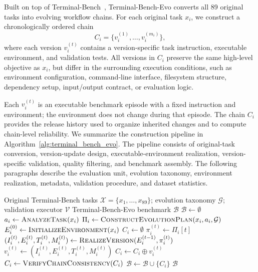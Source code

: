 \documentclass{article}
\begin{document}
Built on top of Terminal-Bench~\cite{terminal-bench}, Terminal-Bench-Evo converts all 89 original tasks into evolving workflow chains. For each original task $x_i$, we construct a chronologically ordered chain
\[
C_i = \{v_i^{(1)}, \ldots, v_i^{(m_i)}\},
\]
where each version $v_i^{(t)}$ contains a version-specific task instruction, executable environment, and validation tests. All versions in $C_i$ preserve the same high-level objective as $x_i$, but differ in the surrounding execution conditions, such as environment configuration, command-line interface, filesystem structure, dependency setup, input/output contract, or evaluation logic.

Each $v_i^{(t)}$ is an executable benchmark episode with a fixed instruction and environment; the environment does not change during that episode. The chain $C_i$ provides the release history used to organize inherited changes and to compute chain-level reliability. We summarize the construction pipeline in Algorithm~\ref{alg:terminal_bench_evo}. The pipeline consists of original-task conversion, version-update design, executable-environment realization, version-specific validation, quality filtering, and benchmark assembly. The following paragraphs describe the evaluation unit, evolution taxonomy, environment realization, metadata, validation procedure, and dataset statistics.

\begin{algorithm}[t]
\caption{Construction of Terminal-Bench-Evo}
\label{alg:terminal_bench_evo}
\begin{algorithmic}[1]
\Require Original Terminal-Bench tasks $\mathcal{X}=\{x_1,\ldots,x_{89}\}$; evolution taxonomy $\mathcal{G}$; validation executor $\mathcal{V}$
\Ensure Terminal-Bench-Evo benchmark $\mathcal{B}$
\State $\mathcal{B}\leftarrow \emptyset$
    \State $a_i \leftarrow \textsc{AnalyzeTask}(x_i)$
    \State $\Pi_i \leftarrow \textsc{ConstructEvolutionPlan}(x_i, a_i, \mathcal{G})$
    \State $E_i^{(0)} \leftarrow \textsc{InitializeEnvironment}(x_i)$
    \State $C_i \leftarrow \emptyset$
        \State $\pi_i^{(t)} \leftarrow \Pi_i[t]$
        \State $(I_i^{(t)}, E_i^{(t)}, T_i^{(t)}, M_i^{(t)}) \leftarrow
        \textsc{RealizeVersion}(E_i^{(t-1)}, \pi_i^{(t)})$
            \State $v_i^{(t)} \leftarrow (I_i^{(t)}, E_i^{(t)}, T_i^{(t)}, M_i^{(t)})$
            \State $C_i \leftarrow C_i \oplus v_i^{(t)}$
        \EndIf
    \EndFor
    \State $C_i \leftarrow \textsc{VerifyChainConsistency}(C_i)$
    \State $\mathcal{B} \leftarrow \mathcal{B} \cup \{C_i\}$
\EndFor
\State \Return $\mathcal{B}$
\end{algorithmic}
\end{algorithm}
\end{document}

